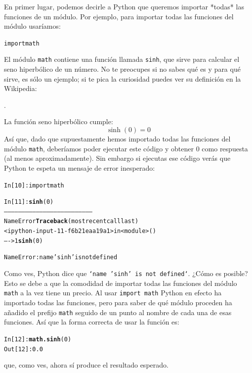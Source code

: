 \documentclass[10pt,a4paper]{article}\usepackage[]{graphicx}\usepackage[]{color}
\makeatletter
\newcommand{\hlnum}[1]{\textcolor[rgb]{0.686,0.059,0.569}{#1}}%
\newcommand{\hlstr}[1]{\textcolor[rgb]{0.192,0.494,0.8}{#1}}%
\newcommand{\hlopt}[1]{\textcolor[rgb]{0,0,0}{#1}}%
\newcommand{\hlstd}[1]{\textcolor[rgb]{0.345,0.345,0.345}{#1}}%
\newcommand{\hlkwd}[1]{\textcolor[rgb]{0.737,0.353,0.396}{\textbf{#1}}}%
\newenvironment{kframe}{%
 \def\at@end@of@kframe{}%
 \ifinner\ifhmode%
  \def\at@end@of@kframe{\end{minipage}}%
  \begin{minipage}{\columnwidth}%
 \fi\fi%
 \def\FrameCommand##1{\hskip\@totalleftmargin \hskip-\fboxsep
 \colorbox{shadecolor}{##1}\hskip-\fboxsep
     \hskip-\linewidth \hskip-\@totalleftmargin \hskip\columnwidth}%
 \MakeFramed {\advance\hsize-\width
   \@totalleftmargin\z@ \linewidth\hsize
   \@setminipage}}%
 {\par\unskip\endMakeFramed%
 \at@end@of@kframe}
\newenvironment{knitrout}{}{} %
\newcounter {cont01}
\makeatother
\begin{document}
En primer lugar, podemos decirle a Python que queremos importar *todas* las funciones de un módulo. Por ejemplo, para importar todas las funciones del módulo usaríamos:
\begin{knitrout}
\color{fgcolor}\begin{kframe}
\begin{alltt}
import math
\end{alltt}
\end{kframe}
\end{knitrout}
El módulo {\tt math} contiene una función llamada {\tt sinh}, que sirve para calcular el seno hiperbólico de un número. No te preocupes si no sabes qué es y para qué sirve, es sólo un ejemplo; si te pica la curiosidad puedes ver su definición en la Wikipedia:
\begin{center}
.
\end{center}
La función seno hiperbólico cumple:
$$\sinh(0) = 0$$
Así que, dado que supuestamente  hemos importado todas las funciones del módulo {\tt math}, deberíamos poder ejecutar este código y obtener 0 como respuesta (al menos aproximadamente).
Sin embargo si ejecutas ese código verás que Python te espeta un mensaje de error inesperado:
\begin{knitrout}
\color{fgcolor}\begin{kframe}
\begin{alltt}
In [10]: import math

In [11]: \hlkwd{sinh}(0)
---------------------------------------------------------------------------
NameError                                 \hlkwd{Traceback} (most recent call last)
<ipython-input-11-f6b21eaa19a1> in <module>()
----> 1 \hlkwd{sinh}(0)

NameError: name \hlstr{'sinh'} is not defined
\end{alltt}
\end{kframe}
\end{knitrout}
Como ves, Python dice que {\tt `name 'sinh' is not defined`}. ¿Cómo es posible? Esto se debe a que la comodidad de importar todas las funciones del módulo {\tt math} a la vez tiene un precio. Al usar {\tt import math} Python en efecto ha importado todas las funciones, pero para saber de qué módulo proceden ha añadido el prefijo {\tt math} seguido de un punto al nombre de cada una de esas funciones. Así que la forma correcta de usar la función es:
\begin{knitrout}
\color{fgcolor}\begin{kframe}
\begin{alltt}
\hlstd{In [}\hlnum{12}\hlstd{]}\hlopt{:} \hlkwd{math.sinh}\hlstd{(}\hlnum{0}\hlstd{)}
\hlstd{Out[}\hlnum{12}\hlstd{]}\hlopt{:} \hlnum{0.0}
\end{alltt}
\end{kframe}
\end{knitrout}
que, como ves, ahora sí produce el resultado esperado.
\end{document}

